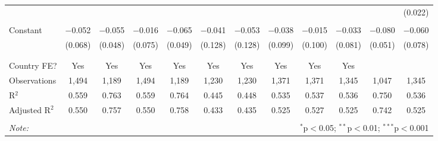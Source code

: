\begin{table}[!htbp]
\begin{tabular}{@{\extracolsep{5pt}}lccccccccccc}
  &  &  &  &  &  &  &  &  &  &  & (0.022) \\ 
  & & & & & & & & & & & \\ 
 Constant & $-$0.052 & $-$0.055 & $-$0.016 & $-$0.065 & $-$0.041 & $-$0.053 & $-$0.038 & $-$0.015 & $-$0.033 & $-$0.080 & $-$0.060 \\ 
  & (0.068) & (0.048) & (0.075) & (0.049) & (0.128) & (0.128) & (0.099) & (0.100) & (0.081) & (0.051) & (0.078) \\ 
  & & & & & & & & & & & \\ 
\hline \\[-1.8ex] 
Country FE? & Yes & Yes & Yes & Yes & Yes & Yes & Yes & Yes & Yes &  &  \\ 
Observations & 1,494 & 1,189 & 1,494 & 1,189 & 1,230 & 1,230 & 1,371 & 1,371 & 1,345 & 1,047 & 1,345 \\ 
R$^{2}$ & 0.559 & 0.763 & 0.559 & 0.764 & 0.445 & 0.448 & 0.535 & 0.537 & 0.536 & 0.750 & 0.536 \\ 
Adjusted R$^{2}$ & 0.550 & 0.757 & 0.550 & 0.758 & 0.433 & 0.435 & 0.525 & 0.527 & 0.525 & 0.742 & 0.525 \\ 
\hline 
\hline \\[-1.8ex] 
\textit{Note:}  & \multicolumn{11}{r}{$^{*}$p$<$0.05; $^{**}$p$<$0.01; $^{***}$p$<$0.001} \\ 
\end{tabular} 
\end{table} 
